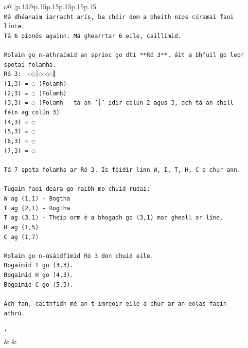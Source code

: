 \documentclass{article}
\begin{document}
{\begin{supertabular}{c@{$\;$}|p{.15\linewidth}@{}p{.15\linewidth}p{.15\linewidth}p{.15\linewidth}p{.15\linewidth}p{.15\linewidth}}
{{{\\ 
\texttt{Má dhéanaim iarracht arís, ba chóir dom a bheith níos cúramaí faoi línte.} \\
\texttt{Tá 6 pionós againn. Má ghearrtar 6 eile, caillimid.} \\
\\ 
\texttt{Molaim go n{-}athraímid an sprioc go dtí **Ró 3**, áit a bhfuil go leor spotaí folamha.} \\
\texttt{Ró 3: ║◌◌│◌◌◌◌║} \\
\texttt{(1,3) = ◌ (Folamh)} \\
\texttt{(2,3) = ◌ (Folamh)} \\
\texttt{(3,3) = ◌ (Folamh {-} tá an '│' idir colún 2 agus 3, ach tá an chill féin ag colún 3)} \\
\texttt{(4,3) = ◌} \\
\texttt{(5,3) = ◌} \\
\texttt{(6,3) = ◌} \\
\texttt{(7,3) = ◌} \\
\\ 
\texttt{Tá 7 spota folamha ar Ró 3. Is féidir linn W, I, T, H, C a chur ann.} \\
\\ 
\texttt{Tugaim faoi deara go raibh mo chuid rudaí:} \\
\texttt{W ag (1,1) {-} Bogtha} \\
\texttt{I ag (2,1) {-} Bogtha} \\
\texttt{T ag (3,1) {-} Theip orm é a bhogadh go (3,1) mar gheall ar líne.} \\
\texttt{H ag (1,5)} \\
\texttt{C ag (1,7)} \\
\\ 
\texttt{Molaim go n{-}úsáidfimid Ró 3 don chuid eile.} \\
\texttt{Bogaimid T go (3,3).} \\
\texttt{Bogaimid H go (4,3).} \\
\texttt{Bogaimid C go (5,3).} \\
\\ 
\texttt{Ach fan, caithfidh mé an t{-}imreoir eile a chur ar an eolas faoin athrú.} \\
\\ 
\texttt{'} \\
            }
        }
    }
    & & \\ \\


\end{supertabular}}
\end{document}

